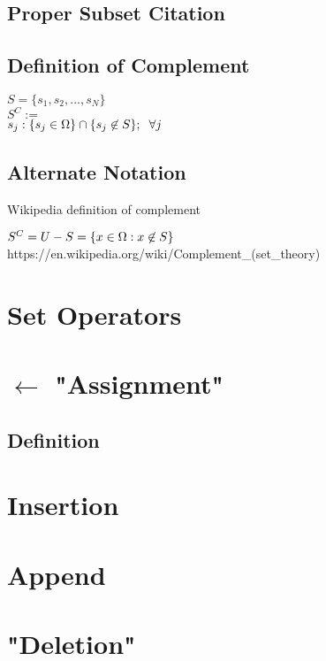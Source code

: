 \documentclass[11pt]{article}
\begin{document}
\subsection{Proper Subset Citation}




\subsection{Definition of Complement}
\begin{center}
$
S = \{ s_1,s_2,...,s_N \}
$
\\
$
S^C :=
$
\\
$
s_j: \{ s_j \in \Omega\} \cap \{s_j \not \in S\}; \hspace{2mm} \forall j
$
\end{center}
\subsection{Alternate Notation}
Wikipedia definition of complement
\begin{center}
$
S^C = U - S = \{x \in \Omega : x \not \in S\} \hspace{3mm} 
$
https://en.wikipedia.org/wiki/Complement\_(set\_theory)
\end{center}



\section*{Set Operators}
\section{$\leftarrow$ "Assignment"}
\subsection{Definition}

\section{Insertion}

\section{Append}

\section{"Deletion"}
\end{document}
